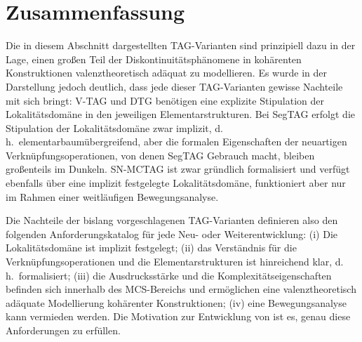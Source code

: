 \section{Zusammenfassung}

Die in diesem Abschnitt dargestellten TAG-Varianten sind prinzipiell dazu in der Lage, einen gro\ss en Teil der Diskontinuitätsphänomene in kohärenten Konstruktionen valenztheoretisch adäquat zu modellieren. Es wurde in der Darstellung jedoch deutlich, dass jede dieser TAG-Varianten gewisse Nachteile mit sich bringt: V-TAG und DTG benötigen eine explizite Stipulation der Lokalitätsdomäne in den jeweiligen Elementarstrukturen. Bei SegTAG erfolgt die Stipulation der Lokalitätsdomäne zwar implizit, d.\,h.\ elementarbaumübergreifend, aber die formalen Eigenschaften der neuartigen Verknüpfungsoperationen, von denen SegTAG Gebrauch macht, bleiben gro\ss enteils im Dunkeln. SN-MCTAG ist zwar gründlich formalisiert und verfügt ebenfalls über eine implizit festgelegte Lokalitätsdomäne, funktioniert aber nur im Rahmen einer weitläufigen Bewegungsanalyse. 

Die Nachteile der bislang vorgeschlagenen TAG-Varianten definieren also den folgenden Anforderungskatalog für jede Neu- oder Weiterentwicklung: (i) Die Lokalitätsdomäne ist implizit festgelegt; (ii) das Verständnis für die Verknüpfungsoperationen und die Elementarstrukturen ist hinreichend klar, d.\,h.\ formalisiert; (iii) die Ausdrucksstärke und die Komplexitätseigenschaften befinden sich innerhalb des MCS-Bereichs und ermöglichen eine valenztheoretisch adäquate Modellierung kohärenter Konstruktionen; (iv) eine Bewegungsanalyse kann vermieden werden. Die Motivation zur Entwicklung von  ist es, genau diese Anforderungen zu erfüllen. 




















 
